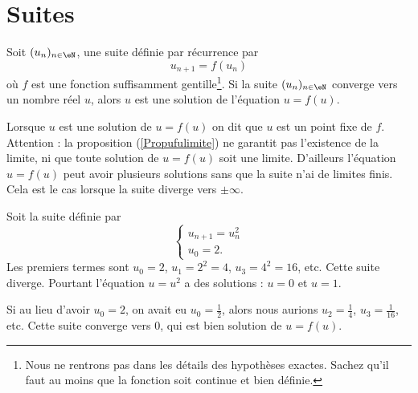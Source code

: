 
\section{Suites}

\begin{proposition}		\label{Propufulimite}
	Soit $(u_n)_{n\in\eN}$, une suite définie par récurrence par 
	\begin{equation}
		u_{n+1}=f(u_n)
	\end{equation}
	où $f$ est une fonction suffisamment gentille\footnote{Nous ne rentrons pas dans les détails des hypothèses exactes. Sachez qu'il faut au moins que la fonction soit continue et bien définie.}. Si la suite $(u_n)_{n\in\eN}$ converge vers un nombre réel $u$, alors $u$ est une solution de l'équation  $u=f(u)$. 
\end{proposition}
Lorsque $u$ est une solution de $u=f(u)$ on dit que $u$ est un point fixe de $f$. Attention : la proposition (\ref{Propufulimite}) ne garantit pas l'existence de la limite, ni que toute solution de $u=f(u)$ soit une limite. D'ailleurs l'équation $u=f(u)$ peut avoir plusieurs solutions sans que la suite n'ai de limites finis. Cela est le cas lorsque la suite diverge vers $\pm\infty$. 

 \begin{example}
	 Soit la suite définie par
	 \begin{equation}
		 \begin{cases}
		 u_{n+1}=u_n^2\\
		u_0=2.
		 \end{cases}
	 \end{equation}
	 Les premiers termes sont $u_0=2$, $u_1=2^2=4$, $u_3=4^2=16$, etc. Cette suite diverge. Pourtant l'équation $u=u^2$ a des solutions : $u=0$ et $u=1$.

	 Si au lieu d'avoir $u_0=2$, on avait eu $u_0=\frac{ 1 }{2}$, alors nous aurions $u_2=\frac{ 1 }{ 4 }$, $u_3=\frac{1}{ 16 }$, etc. Cette suite converge vers $0$, qui est bien solution de $u=f(u)$.
\end{example}


